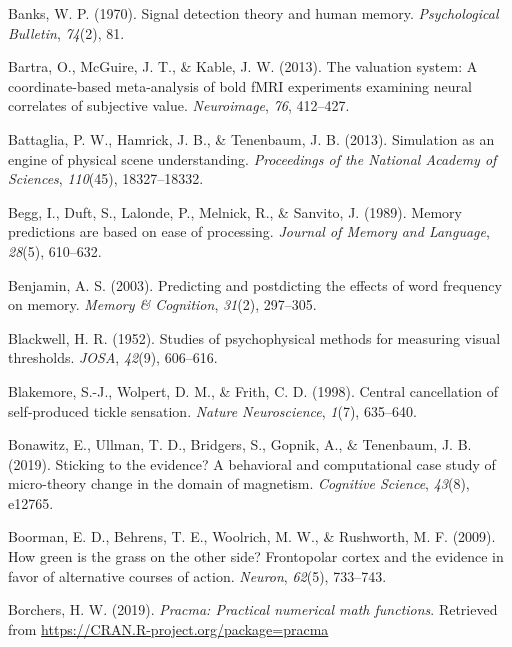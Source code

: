 \documentclass[12pt,twoside]{reedthesis}
\begin{document}
\leavevmode\hypertarget{ref-banks1970signal}{}%
Banks, W. P. (1970). Signal detection theory and human memory. \emph{Psychological Bulletin}, \emph{74}(2), 81.

\leavevmode\hypertarget{ref-bartra2013valuation}{}%
Bartra, O., McGuire, J. T., \& Kable, J. W. (2013). The valuation system: A coordinate-based meta-analysis of bold fMRI experiments examining neural correlates of subjective value. \emph{Neuroimage}, \emph{76}, 412--427.

\leavevmode\hypertarget{ref-battaglia2013simulation}{}%
Battaglia, P. W., Hamrick, J. B., \& Tenenbaum, J. B. (2013). Simulation as an engine of physical scene understanding. \emph{Proceedings of the National Academy of Sciences}, \emph{110}(45), 18327--18332.

\leavevmode\hypertarget{ref-begg1989memory}{}%
Begg, I., Duft, S., Lalonde, P., Melnick, R., \& Sanvito, J. (1989). Memory predictions are based on ease of processing. \emph{Journal of Memory and Language}, \emph{28}(5), 610--632.

\leavevmode\hypertarget{ref-benjamin2003predicting}{}%
Benjamin, A. S. (2003). Predicting and postdicting the effects of word frequency on memory. \emph{Memory \& Cognition}, \emph{31}(2), 297--305.

\leavevmode\hypertarget{ref-blackwell1952studies}{}%
Blackwell, H. R. (1952). Studies of psychophysical methods for measuring visual thresholds. \emph{JOSA}, \emph{42}(9), 606--616.

\leavevmode\hypertarget{ref-blakemore1998central}{}%
Blakemore, S.-J., Wolpert, D. M., \& Frith, C. D. (1998). Central cancellation of self-produced tickle sensation. \emph{Nature Neuroscience}, \emph{1}(7), 635--640.

\leavevmode\hypertarget{ref-bonawitz2019sticking}{}%
Bonawitz, E., Ullman, T. D., Bridgers, S., Gopnik, A., \& Tenenbaum, J. B. (2019). Sticking to the evidence? A behavioral and computational case study of micro-theory change in the domain of magnetism. \emph{Cognitive Science}, \emph{43}(8), e12765.

\leavevmode\hypertarget{ref-boorman2009green}{}%
Boorman, E. D., Behrens, T. E., Woolrich, M. W., \& Rushworth, M. F. (2009). How green is the grass on the other side? Frontopolar cortex and the evidence in favor of alternative courses of action. \emph{Neuron}, \emph{62}(5), 733--743.

\leavevmode\hypertarget{ref-R-pracma}{}%
Borchers, H. W. (2019). \emph{Pracma: Practical numerical math functions}. Retrieved from \url{https://CRAN.R-project.org/package=pracma}
\end{document}
